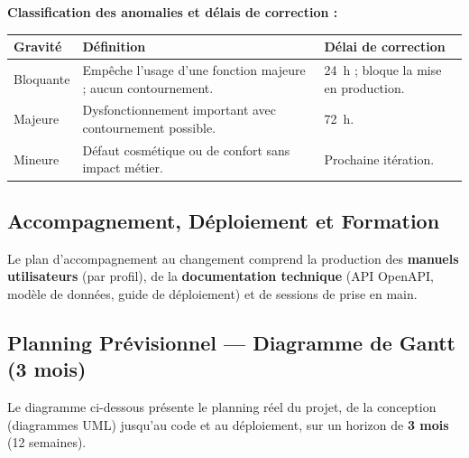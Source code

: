 \documentclass[11pt,a4paper]{article}
\begin{document}
\textbf{Classification des anomalies et délais de correction :}
\begin{center}
\begin{longtable}{|L{2.6cm}|L{7.4cm}|L{3.4cm}|}
\hline
{}\textbf{Gravité} & \textbf{Définition} & \textbf{Délai de correction}\\\hline
\endhead
Bloquante & Empêche l'usage d'une fonction majeure ; aucun contournement. & 24~h ; bloque la mise en production.\\\hline
Majeure & Dysfonctionnement important avec contournement possible. & 72~h.\\\hline
Mineure & Défaut cosmétique ou de confort sans impact métier. & Prochaine itération.\\\hline
\end{longtable}
\end{center}

\subsection{Accompagnement, Déploiement et Formation}
Le plan d'accompagnement au changement comprend la production des \textbf{manuels
utilisateurs} (par profil), de la \textbf{documentation technique} (API OpenAPI,
modèle de données, guide de déploiement) et de sessions de prise en main.

\subsection{Planning Prévisionnel — Diagramme de Gantt (3 mois)}
Le diagramme ci-dessous présente le planning réel du projet, de la conception
(diagrammes UML) jusqu'au code et au déploiement, sur un horizon de \textbf{3 mois}
(12 semaines).
\end{document}
